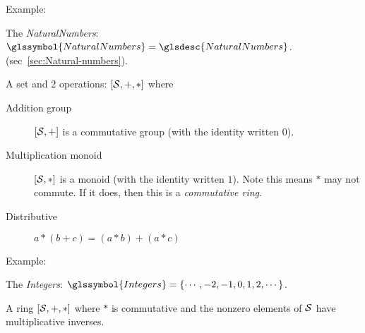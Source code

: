 Example: 

The \textit{\gls{NaturalNumbers}}: 
$\glssymbol{NaturalNumbers} = \glsdesc{NaturalNumbers}$.
(sec~\ref{sec:Natural-numbers}).

\label{sec:Ring}
\cite{wiki:Ring-mathematics}

A set and $2$ operations: $\left[ \mathcal{S}, +, * \right]$
where
\begin{description}
  \item[Addition group] $\left[ \mathcal{S}, + \right]$ 
  is a commutative group (with the identity written $0$).
  \item[Multiplication monoid] $\left[ \mathcal{S}, * \right]$ 
  is a monoid (with the identity written $1$).
  Note this means $*$ may not commute. If it does, 
  then this is a \textit{commutative ring}.
  \item[Distributive] $a * \left( b + c \right) 
  = \left( a * b \right) + \left( a * c \right)$
\end{description}

Example:

The \textit{\gls{Integers}}: 
$\glssymbol{Integers} = \{\cdots, -2, -1, 0, 1, 2, \cdots\}$.

\label{sec:Field}
\cite{wiki:Field-mathematics}

A ring $\left[ \mathcal{S}, +, * \right]$ where
$*$ is commutative and the nonzero elements of $\mathcal{S}$
have multiplicative inverses.

